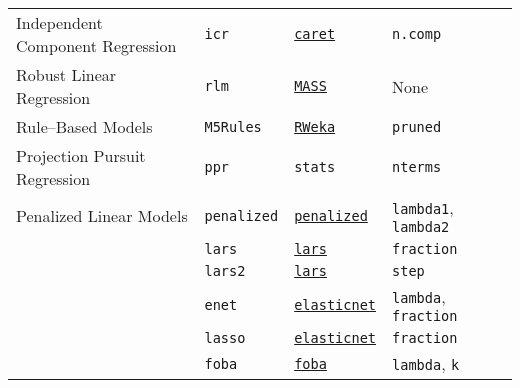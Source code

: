 \documentclass[12pt]{article}
\begin{document}
\begin{landscape}
\begin{longtable}{lllll}
\rowcolor[rgb]{.95, .95, .95}   
       Independent Component Regression&
         \texttt{icr} & 
             {\tt \href{http://cran.r-project.org/web/packages/caret/index.html}{caret}}      & 
            \texttt{n.comp}  \\              
           
                
      Robust Linear Regression &
         \texttt{rlm} & 
             {\tt \href{http://cran.r-project.org/web/packages/MASS/index.html}{MASS}}       & 
            None \\              
                   
 \rowcolor[rgb]{.95, .95, .95}   
      Rule--Based Models &
         \texttt{M5Rules} & 
            {\tt \href{http://cran.r-project.org/web/packages/RWeka/index.html}{RWeka}}    & 
            \texttt{pruned}  \\             


      Projection Pursuit Regression  &
         \texttt{ppr} & 
            \texttt{stats}       & 
            \texttt{nterms} \\            
         
\rowcolor[rgb]{.95, .95, .95}               
      Penalized Linear Models  &
         \texttt{penalized} & 
             {\tt \href{http://cran.r-project.org/web/packages/penalized/index.html}{penalized}}      & 
            \texttt{lambda1}, \texttt{lambda2} \\            
\rowcolor[rgb]{.95, .95, .95}          
       &
         \texttt{lars} & 
             {\tt \href{http://cran.r-project.org/web/packages/lars/index.html}{lars}}      & 
            \texttt{fraction} \\   
\rowcolor[rgb]{.95, .95, .95}               
         &
         \texttt{lars2} & 
             {\tt \href{http://cran.r-project.org/web/packages/lars/index.html}{lars}}        & 
            \texttt{step} \\            
\rowcolor[rgb]{.95, .95, .95}                   
      &
         \texttt{enet} & 
             {\tt \href{http://cran.r-project.org/web/packages/elasticnet/index.html}{elasticnet}}      & 
            \texttt{lambda}, \texttt{fraction} \\          
\rowcolor[rgb]{.95, .95, .95}   
      &
         \texttt{lasso} & 
             {\tt \href{http://cran.r-project.org/web/packages/elasticnet/index.html}{elasticnet}}      & 
            \texttt{fraction} \\       
\rowcolor[rgb]{.95, .95, .95}         
       &
         \texttt{foba} & 
             {\tt \href{http://cran.r-project.org/web/packages/foba/index.html}{foba}}       & 
            \texttt{lambda}, \texttt{k} \\    
                              

\end{longtable}
\end{landscape}
\end{document}
